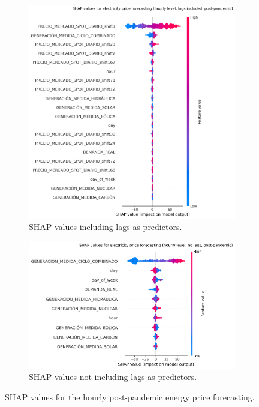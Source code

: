 \begin{figure}[H]
\centering
    \begin{subfigure}{.45\textwidth}
        \centering
        \includegraphics[width=1\linewidth]{images/analysis/shap-hourly-post}
        \caption{SHAP values including lags as predictors.}
        \label{fig:shap-hourly-post-lags}
    \end{subfigure}
    \begin{subfigure}{.45\textwidth}
        \centering
        \includegraphics[width=1\linewidth]{images/analysis/shap-hourly-post-nolags}
        \caption{SHAP values not including lags as predictors.}
        \label{fig:shap-hourly-post-nolags}
    \end{subfigure}

    \caption{SHAP values for the hourly post-pandemic energy price forecasting.}
    \label{fig:shap-hourly-post}
\end{figure}

